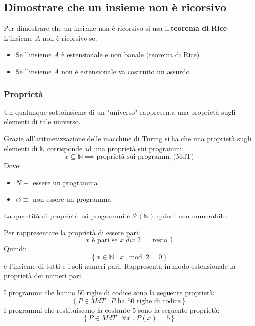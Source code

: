 \documentclass[a4paper]{article}
\begin{document}
\subsection{Dimostrare che un insieme non è ricorsivo}
Per dimostrare che un insieme non è ricorsivo si usa il \textbf{teorema di Rice}
L'insieme \( A \) non è ricorsivo se:
\begin{itemize}
  \item Se l'insieme \( A \) è estensionale e non banale (teorema di Rice)
  \item Se l'insieme \( A \) non è estensionale va costruito un assurdo
\end{itemize}

\subsubsection{Proprietà}
\begin{definition}
  Un qualunque sottoinsieme di un "universo" rappresenta una proprietà sugli
  elementi di tale universo.

  \vspace{1em}
  \noindent
  Grazie all'aritmetizzazione delle macchine di Turing si ha che una proprietà
  sugli elementi di \( \mathbb{N} \) corrisponde ad una proprietà sui programmi:
  \[
    x \subseteq \mathbb{N} \implies \text{proprietà sui programmi (MdT)}
  \] 
  Dove:
  \begin{itemize}
    \item \( N \equiv \) essere un programma
    \item \( \varnothing \equiv \) non essere un programma
  \end{itemize}
  La quantità di proprietà sui programmi è \( \mathcal{P}(\mathbb{N}) \) quindi non
  numerabile.
\end{definition}

\begin{example}
  Per rappresentare la proprietà di essere pari:
  \[
    x \text{ è pari se } x \;div\; 2 = \text{ resto } 0
  \] 
  Quindi:
  \[
    \left\{ \left. x \in \mathbb{N} \;\right|\; x \mod 2 = 0 \right\}
  \] 
  è l'insieme di tutti e i soli numeri pari. Rappresenta in modo
  estensionale la proprietà dei numeri pari.
\end{example}

\begin{example}
  I programmi che hanno 50 righe di codice sono la seguente proprietà:
  \[
    \left\{\left. P \in MdT \;\right|\; P \text{ ha 50 righe di codice} \right\}
  \] 
  I programmi che restituiscono la costante 5 sono la seguente proprietà:
  \[
    \left\{\left. P \in MdT \;\right|\; \forall x \;.\; P(x) = 5 \right\}
  \] 
\end{example}
\end{document}
